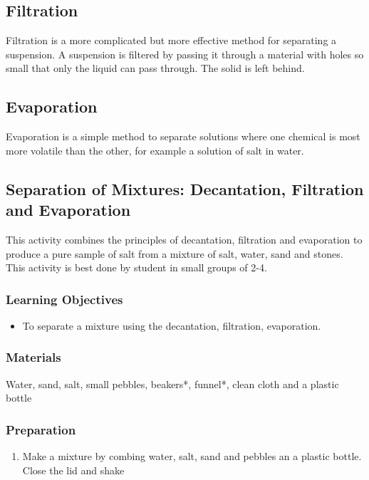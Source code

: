\subsection{Filtration}

Filtration is a more complicated but more effective method for separating a suspension. A suspension is filtered by passing it through a material with holes so small that only the liquid can pass through. The solid is left behind.

\subsection{Evaporation}

Evaporation is a simple method to separate solutions where one chemical is most more volatile than the other, for example a solution of salt in water.

\subsection{Separation of Mixtures: Decantation, Filtration and Evaporation}
This activity combines the principles of decantation, filtration and evaporation to produce a pure sample of salt from a mixture of salt, water, sand and stones. This activity is best done by student in small groups of 2-4.

\subsubsection*{Learning Objectives}
\begin{itemize}
\item{To separate  a mixture using the decantation, filtration, evaporation.}
\end{itemize}

\subsubsection*{Materials}
Water, sand, salt, small pebbles, beakers*, funnel*, clean cloth and a plastic bottle
\subsubsection*{Preparation}
\begin{enumerate}
\item{Make a mixture by combing water, salt, sand and pebbles an a plastic bottle. Close the lid and shake}
\end{enumerate}
